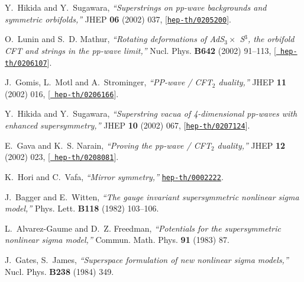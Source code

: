 \documentclass[a4paper,12pt]{article}
\numberwithin{equation}{section}
\begin{document}
\begin{thebibliography}{10}
Y.~Hikida and Y.~Sugawara, {\it ``Superstrings on pp-wave backgrounds and
  symmetric orbifolds,''}  JHEP {\bf 06} (2002) 037,
  [\href{http://arXiv.org/abs/hep-th/0205200}{{\tt hep-th/0205200}}].

O.~Lunin and S.~D. Mathur, {\it ``Rotating deformations of {AdS$_3\times$
  S$^3$}, the orbifold {CFT} and strings in the pp-wave limit,''}  Nucl. Phys.
  {\bf B642} (2002) 91--113, [\href{http://arXiv.org/abs/hep-th/0206107}{{\tt
  hep-th/0206107}}].

J.~Gomis, L.~Motl and A.~Strominger, {\it ``{PP}-wave / {CFT$_2$} duality,''}
  JHEP {\bf 11} (2002) 016, [\href{http://arXiv.org/abs/hep-th/0206166}{{\tt
  hep-th/0206166}}].

Y.~Hikida and Y.~Sugawara, {\it ``Superstring vacua of 4-dimensional pp-waves
  with enhanced supersymmetry,''}  JHEP {\bf 10} (2002) 067,
  [\href{http://arXiv.org/abs/hep-th/0207124}{{\tt hep-th/0207124}}].

E.~Gava and K.~S. Narain, {\it ``Proving the pp-wave / {CFT$_2$} duality,''}
  JHEP {\bf 12} (2002) 023, [\href{http://arXiv.org/abs/hep-th/0208081}{{\tt
  hep-th/0208081}}].

K.~Hori and C.~Vafa, {\it ``Mirror symmetry,''}
  \href{http://arXiv.org/abs/hep-th/0002222}{{\tt hep-th/0002222}}.

J.~Bagger and E.~Witten, {\it ``The gauge invariant supersymmetric nonlinear
  sigma model,''}  Phys. Lett. {\bf B118} (1982) 103--106.

L.~Alvarez-Gaume and D.~Z. Freedman, {\it ``Potentials for the supersymmetric
  nonlinear sigma model,''}  Commun. Math. Phys. {\bf 91} (1983) 87.

J.~Gates, S.~James, {\it ``Superspace formulation of new nonlinear sigma
  models,''}  Nucl. Phys. {\bf B238} (1984) 349.

\end{thebibliography}\endgroup
\end{document}
